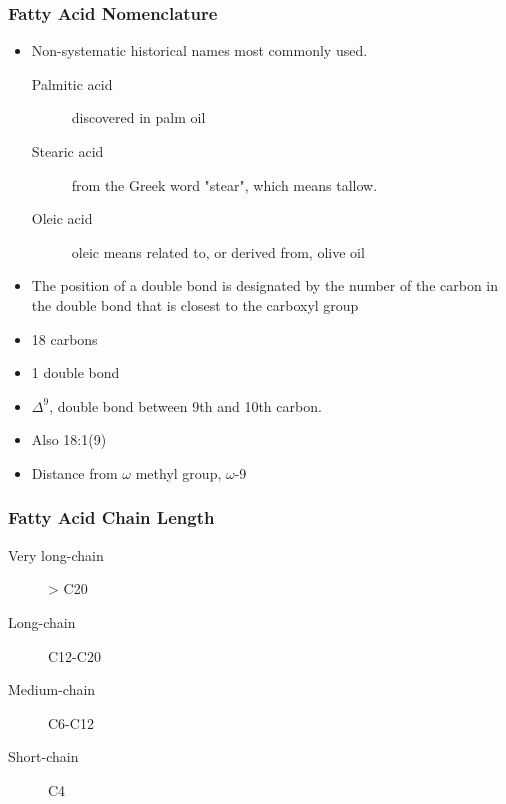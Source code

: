 \documentclass{scrartcl}
\begin{document}
\subsubsection{Fatty Acid Nomenclature}
\label{sec:org12eac93}
\begin{itemize}
\item Non-systematic historical names most commonly used.
\begin{description}
\item[{Palmitic acid}] discovered in palm oil
\item[{Stearic acid}] from the Greek word "stear", which means tallow.
\item[{Oleic acid}] oleic means related to, or derived from, olive oil
\end{description}
\item The position of a double bond is designated by the number of the carbon in the double bond that is closest to the carboxyl group
\end{itemize}



\begin{itemize}
\item 18 carbons
\item 1 double bond
\item \(\Delta^{\text{9}}\), double bond between 9th and 10th carbon.
\item Also 18:1(9)
\item Distance from \(\omega\) methyl group, \(\omega\)-9
\end{itemize}

\subsubsection{Fatty Acid Chain Length}
\label{sec:orgb4ec8b5}

\begin{description}
\item[{Very long-chain}] > C20
\item[{Long-chain}] C12-C20
\item[{Medium-chain}] C6-C12
\item[{Short-chain}] C4
\end{description}
\end{document}
